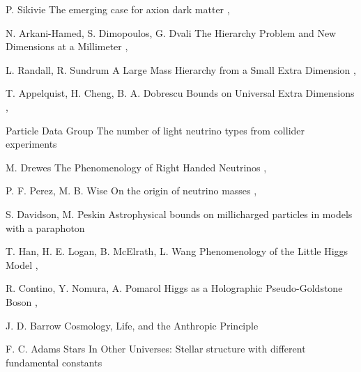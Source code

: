 {P. Sikivie}
{The emerging case for axion dark matter}
{, }

{N. Arkani-Hamed, S. Dimopoulos, G. Dvali}
{The Hierarchy Problem and New Dimensions at a Millimeter}
{, }

{L. Randall, R. Sundrum}
{A Large Mass Hierarchy from a Small Extra Dimension}
{, }

{T. Appelquist, H. Cheng, B. A. Dobrescu}
{Bounds on Universal Extra Dimensions}
{, }

{Particle Data Group}
{The number of light neutrino types from collider experiments}
{}

{M. Drewes}
{The Phenomenology of Right Handed Neutrinos}
{, }

{P. F. Perez, M. B. Wise}
{On the origin of neutrino masses}
{, }

{S. Davidson, M. Peskin}
{Astrophysical bounds on millicharged particles in models with a paraphoton}
{}

{T. Han, H. E. Logan, B. McElrath, L. Wang}
{Phenomenology of the Little Higgs Model}
{, }

{R. Contino, Y. Nomura, A. Pomarol}
{Higgs as a Holographic Pseudo-Goldstone Boson}
{, }

{J. D. Barrow}
{Cosmology, Life, and the Anthropic Principle}
{}

{F. C. Adams}
{Stars In Other Universes: Stellar structure with different fundamental constants}
{}

